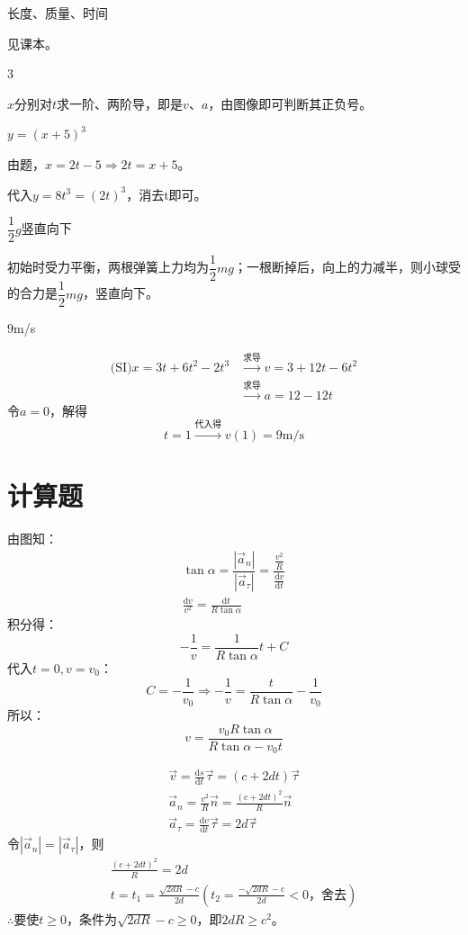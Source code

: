\documentclass[b5paper,opensource,sourcefont,parskip]{qyxf-book}
\newcommand{\di}[1]{\mathrm{d}#1}
\newcommand{\dy}[2]{\frac{\di{#1}}{\di{#2}}}
\begin{document}
 长度、质量、时间

\solve 见课本。

 3

\solve $x$分别对$t$求一阶、两阶导，即是$v$、$a$，由图像即可判断其正负号。

 $y={(x+5)}^3$

\solve 由题，$x=2t-5\Rightarrow 2t=x+5$。

代入$y=8t^3={(2t)}^3$，消去t即可。

$\dfrac{1}{2}g$\qquad 竖直向下

\solve 初始时受力平衡，两根弹簧上力均为$\dfrac{1}{2}mg$；一根断掉后，向上的力减半，则小球受的合力是$\dfrac{1}{2}mg$，竖直向下。

$9$m/s

\solve 
\begin{align*}
\text{(SI)} x=3t+6t^2-2t^3&\xrightarrow{\text{求导}}v=3+12t-6t^2\\
&\xrightarrow{\text{求导}}a=12-12t
\end{align*}
令$a=0$，解得
\[
t=1\xrightarrow{\text{代入得}} v(1)=9\mathrm{m/s}
\]

\section{计算题}

\solve 
由图知：
\begin{gather*}
\tan\alpha=\dfrac{|\vec{a}_n|}{|\vec{a}_\tau|}=\dfrac{\frac{v^2}{R}}{\dy{v}{t}}\\
\frac{\di{v}}{v^2}=\frac{\di{t}}{R\tan\alpha}
\end{gather*}
积分得：
\[
-\frac{1}{v}=\frac{1}{R\tan\alpha}t+C
\]
代入$t=0,v=v_0$：
\[
C=-\dfrac{1}{v_0}\Rightarrow -\frac{1}{v}=\frac{t}{R\tan\alpha}-\dfrac{1}{v_0}
\]
所以：
\[
v=\frac{v_0R\tan\alpha}{R\tan\alpha-v_0t}
\]


\solve 
\begin{gather*}
\vec{v}=\dy{s}{t}\vec{\tau}=(c+2dt)\vec{\tau}\\  
\vec{a}_n=\frac{v^2}{R}\vec{n}=\frac{(c+2dt)^2}{R}\vec{n}\\
\vec{a}_\tau=\dy{v}{t}\vec{\tau}=2d\vec{\tau}
\end{gather*}
令$|\vec{a}_n|=|\vec{a}_\tau|$，则
\begin{gather*}
\frac{(c+2dt)^2}{R}=2d\\
t=t_1=\frac{\sqrt{2dR}-c}{2d}\left(t_2=\frac{-\sqrt{2dR}-c}{2d}<0\text{，舍去}\right)
\end{gather*}
$\therefore$要使$t\geqslant0$，条件为$\sqrt{2dR}-c\geqslant0$，即$2dR\geqslant c^2$。
\end{document}
